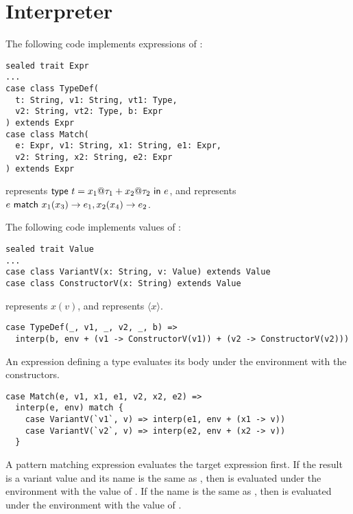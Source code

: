 \section{Interpreter}

The following code implements expressions of \lang:

\begin{verbatim}
sealed trait Expr
...
case class TypeDef(
  t: String, v1: String, vt1: Type,
  v2: String, vt2: Type, b: Expr
) extends Expr
case class Match(
  e: Expr, v1: String, x1: String, e1: Expr,
  v2: String, x2: String, e2: Expr
) extends Expr
\end{verbatim}

 represents
$\textsf{type}\ t=x_1@\tau_1+x_2@\tau_2\ \textsf{in}\ e$, and
 represents
$e\ \textsf{match}\ x_1(x_3)\rightarrow e_1,x_2(x_4)\rightarrow e_2$.

The following code implements values of \lang:

\begin{verbatim}
sealed trait Value
...
case class VariantV(x: String, v: Value) extends Value
case class ConstructorV(x: String) extends Value
\end{verbatim}

 represents $x(v)$, and
 represents $\langle x\rangle$.

\begin{verbatim}
case TypeDef(_, v1, _, v2, _, b) =>
  interp(b, env + (v1 -> ConstructorV(v1)) + (v2 -> ConstructorV(v2)))
\end{verbatim}

An expression defining a type evaluates its body under the
environment with the constructors.

\begin{verbatim}
case Match(e, v1, x1, e1, v2, x2, e2) =>
  interp(e, env) match {
    case VariantV(`v1`, v) => interp(e1, env + (x1 -> v))
    case VariantV(`v2`, v) => interp(e2, env + (x2 -> v))
  }
\end{verbatim}

A pattern matching expression evaluates the target expression first.
If the result is a variant value and its name is the same as ,
then  is evaluated under the environment with the value of
. If the name is the same as , then  is
evaluated under the environment with the value of .

